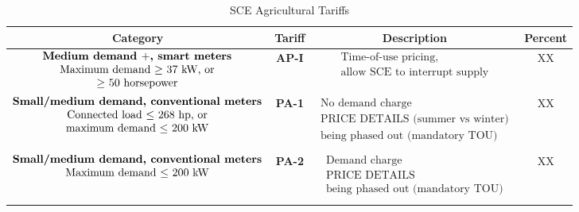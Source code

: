 \documentclass[hidelinks,12pt]{article}
\begin{document}
\begin{table}[b!]\centering
\footnotesize
\caption{SCE Agricultural Tariffs}
\label{tab:sce_ag_tariffs}
\vspace{-2mm}
\begin{adjustbox}{center}
\begin{tabular}{|c|c|c|c|}
\hline
\textbf{Category} & \textbf{Tariff} & \textbf{ Description} & \textbf{ Percent} \\
\hline
$ \begin{matrix}
\text{\bf Medium demand $+$, smart meters} \\
\text{Maximum demand $\ge$ 37 kW, or} \\
\text{$\ge$ 50 horsepower}
\end{matrix} $
 & \textbf{AP-I} &  
\footnotesize $ \begin{matrix}
\text{Time-of-use pricing, } \\
\text{allow SCE to interrupt supply} \\
\end{matrix} $ &  XX \\
\hline
$ \begin{matrix}
\text{\bf Small/medium demand, conventional meters} \\
\text{Connected load $\leq$ 268 hp, or} \\
\text{maximum demand $\leq$ 200 kW} \\
\end{matrix} $ & \textbf{PA-1} &
\footnotesize $ \begin{matrix}
\text{No demand charge} \\
\text{PRICE DETAILS (summer vs winter)} \\
\text{being phased out (mandatory TOU)} \\
\end{matrix} $ &  XX \\
\hline
$ \begin{matrix}
\text{\bf Small/medium demand, conventional meters} \\
\text{Maximum demand $\leq$ 200 kW} \\
\end{matrix} $ & \textbf{PA-2} &
\footnotesize $ \begin{matrix}
\text{Demand charge} \\
\text{PRICE DETAILS} \\
\text{being phased out (mandatory TOU)} \\
\end{matrix} $ &  XX \\
\hline


\end{tabular}
\end{adjustbox}
\end{table}
\end{document}
